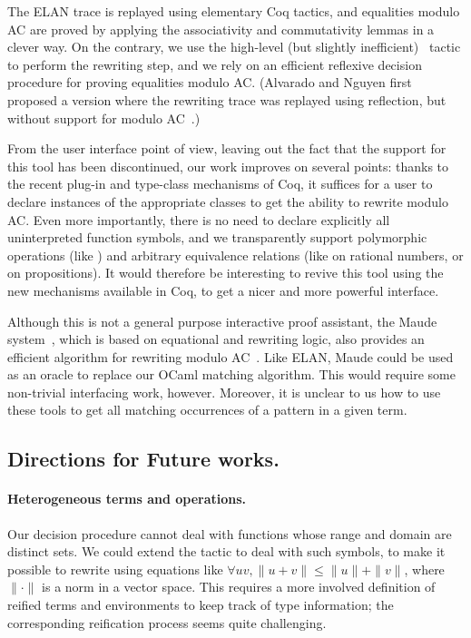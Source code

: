 \documentclass{llncs}
\begin{document}
The ELAN trace is replayed using elementary Coq tactics, and
equalities modulo AC are proved by applying the associativity and
commutativity lemmas in a clever way. On the contrary, we use the
high-level (but slightly inefficient) \rewrite\ tactic to perform the
rewriting step, and we rely on an efficient reflexive decision
procedure for proving equalities modulo AC. (Alvarado and Nguyen first
proposed a version where the rewriting trace was replayed using
reflection, but without support for modulo AC~\cite{alvarado}.)

From the user interface point of view, leaving out the fact that the
support for this tool has been discontinued, our work improves on
several points: thanks to the recent plug-in and type-class mechanisms
of Coq, it suffices for a user to declare instances of the appropriate
classes to get the ability to rewrite modulo AC. Even more
importantly, there is no need to declare explicitly all uninterpreted
function symbols, and we transparently support polymorphic operations
(like ) and arbitrary equivalence relations (like
 on rational numbers, or  on propositions).
It would therefore be interesting to revive this tool using the new
mechanisms available in Coq, to get a nicer and more powerful
interface.

\smallskip

Although this is not a general purpose interactive proof assistant,
the Maude system~\cite{maude}, which is based on equational and
rewriting logic, also provides an efficient algorithm for rewriting
modulo AC~\cite{eker-02}.
Like ELAN, Maude could be used as an oracle to replace our OCaml
matching algorithm. This would require some non-trivial interfacing
work, however. Moreover, it is unclear to us how to use these tools to
get all matching occurrences of a pattern in a given term.


\subsection{Directions for Future works.} 
\label{ssec:future}

\paragraph{Heterogeneous terms and operations.} 

Our decision procedure cannot deal with functions whose range and
domain are distinct sets. We could extend the tactic to deal with such
symbols, to make it possible to rewrite using equations like $\forall
u v, \|u+ v\| \leq \|u\| + \|v\|$, where $\|\cdot\|$ is a norm in a
vector space. This requires a more involved definition of reified
terms and environments to keep track of type information; the
corresponding reification process seems quite challenging.
\end{document}
